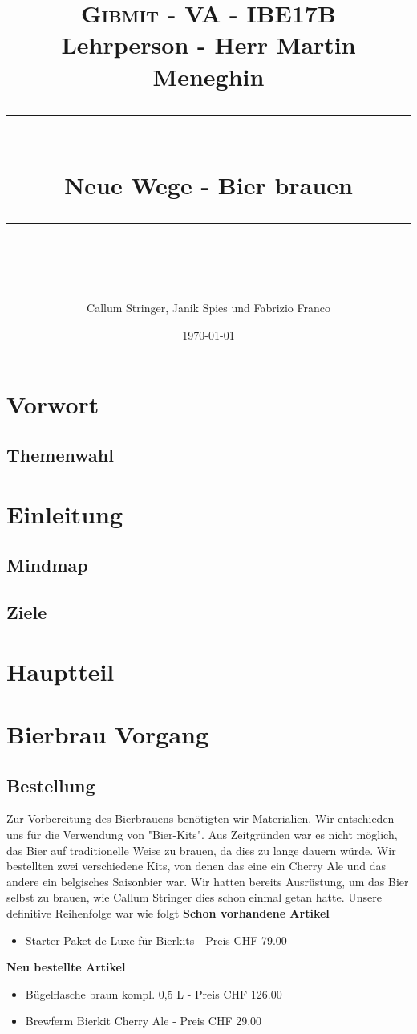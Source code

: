 \documentclass[12pt]{scrartcl}
\title{	
	\normalfont\small
	\textsc{Gibmit - VA - IBE17B}\\ 
	{Lehrperson - Herr Martin Meneghin}
	\vspace{25pt} 
	\rule{\linewidth}{0.5pt}\\
	\vspace{16pt} 
	{\huge Neue Wege - Bier brauen}\\ 
	\vspace{10pt} 
	\rule{\linewidth}{2pt}\\ 
	\author{\large Callum Stringer, Janik Spies und Fabrizio Franco} 
	\vspace{12pt} 
	\date{\small\today} 
}
\begin{document}
\maketitle
\thispagestyle{empty}
\newpage
\tableofcontents

\section{Vorwort}
\subsection{Themenwahl}

\newpage
\section{Einleitung}

\subsection{Mindmap}


\subsection{Ziele} \label{introduction}

\section{Hauptteil}
\section{Bierbrau Vorgang}
\subsection{Bestellung}
Zur Vorbereitung des Bierbrauens benötigten wir Materialien.
Wir entschieden uns für die Verwendung von "Bier-Kits". Aus Zeitgründen war es nicht möglich,
 das Bier auf traditionelle Weise zu brauen, da dies zu lange dauern würde.
Wir bestellten zwei verschiedene Kits, von denen das eine ein Cherry Ale und das andere ein belgisches Saisonbier war.
Wir hatten bereits Ausrüstung, um das Bier selbst zu brauen, wie Callum Stringer dies schon einmal getan hatte.
 Unsere definitive Reihenfolge war wie folgt
\textbf{Schon vorhandene Artikel}
\begin{itemize}
	\item Starter-Paket de Luxe für Bierkits - Preis CHF 79.00
\end{itemize}
\textbf{Neu bestellte Artikel}
\begin{itemize}
	\item Bügelflasche braun kompl. 0,5 L - Preis CHF 126.00
	\item Brewferm Bierkit Cherry Ale - Preis CHF 29.00
\end{itemize}
\end{document}
